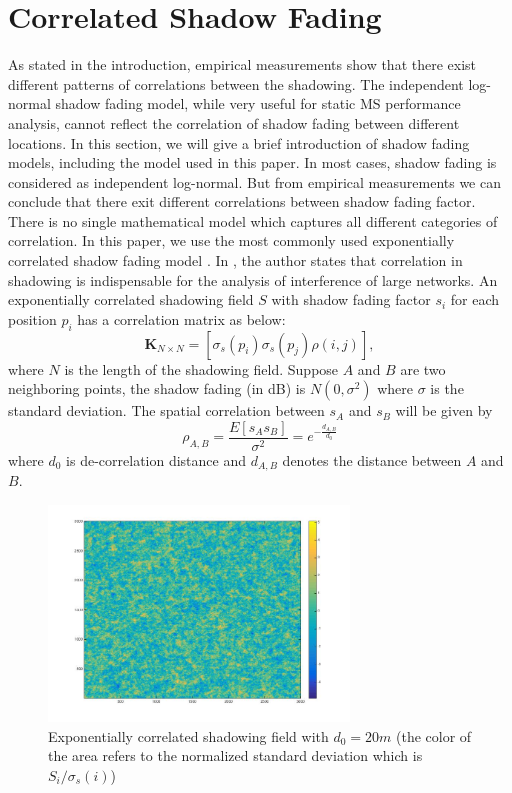 \documentclass[journal,10pt]{IEEEtran}
\begin{document}
\section{Correlated Shadow Fading}
\label{CorrShadowField}
As stated in the introduction, empirical measurements show that there exist different patterns of correlations between the shadowing. The independent log-normal shadow fading model, while very useful for static MS performance analysis, cannot reflect the correlation of shadow fading between different locations. In this section, we will give a brief introduction of shadow fading models, including the model used in this paper.
In most cases, shadow fading is considered as independent log-normal. But from empirical measurements we can conclude that there exit different correlations between shadow fading factor. There is no single mathematical model which captures all different categories of correlation\cite{szyszkowicz2010feasibility}. In this paper, we use the most commonly used exponentially correlated shadow fading model \cite{szyszkowicz2011interference}. In \cite{szyszkowicz2011interference}, the author states that correlation in shadowing is indispensable for the analysis of interference of large networks. An exponentially correlated shadowing field $S$ with shadow fading factor $s_{i}$ for each position $p_{i}$ has a correlation matrix as below:
\begin{equation}
\mathbf{K}_{N\times N} = [ \sigma_{s}(p_{i})\sigma_{s}(p_{j})\rho(i,j)],
\label{correlationmatrix}
\end{equation}
where $N$ is the length of the shadowing field. Suppose $A$ and $B$ are two neighboring points, the shadow fading (in dB) is $N(0,\sigma^2)$ where $\sigma$ is the standard deviation. The spatial correlation between $s_{A}$ and $s_{B}$ will be given by 
\begin{equation}
\rho_{A,B} = \frac{E[s_{A}s_{B}]}{\sigma^2} =e^{-\frac{d_{A,B}}{d_{0}}}
\end{equation}
where $d_{0}$ is de-correlation distance and  $d_{A, B}$ denotes the distance between $A$ and $B$.
\begin{figure}
\centering
\includegraphics[width = 8cm]{ShadowFieldDeCorr20.jpg}
\caption{Exponentially correlated shadowing field with $d_{0} = 20m$ (the color of the area refers to the normalized standard deviation  which is $S_{i}/\sigma_{s}(i)$)}

\label{shadowingfield}
\end{figure}
\end{document}
